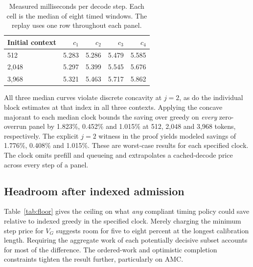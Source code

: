 \begin{table}[tb]\centering
\caption{Measured milliseconds per decode step. Each cell is the median of eight timed windows. The replay uses one row throughout each panel.}\label{tab:cost}
\begin{tabular}{lrrrr}\toprule
Initial context & \(c_1\) & \(c_2\) & \(c_3\) & \(c_4\)\\\midrule
512 & 5.283 & 5.286 & 5.479 & 5.585\\
2,048 & 5.297 & 5.399 & 5.545 & 5.676\\
3,968 & 5.321 & 5.463 & 5.717 & 5.862\\\bottomrule
\end{tabular}
\end{table}
All three median curves violate discrete concavity at $j=2$, as do the individual block estimates at that index in all three contexts. Applying the concave majorant to each median clock bounds the saving over greedy on \emph{every} zero-overrun panel by 1.823\%, 0.452\% and 1.015\% at 512, 2,048 and 3,968 tokens, respectively. The explicit $j=2$ witness in the proof yields modeled savings of 1.776\%, 0.408\% and 1.015\%. These are worst-case results for each specified clock. The clock omits prefill and queueing and extrapolates a cached-decode price across every step of a panel.

\subsection{Headroom after indexed admission}
Table~\ref{tab:floor} gives the ceiling on what \emph{any} compliant timing policy could save relative to indexed greedy in the specified clock. Merely charging the minimum step price for \(V_G\) suggests room for five to eight percent at the longest calibration length. Requiring the aggregate work of each potentially decisive subset accounts for most of the difference. The ordered-work and optimistic completion constraints tighten the result further, particularly on AMC.

